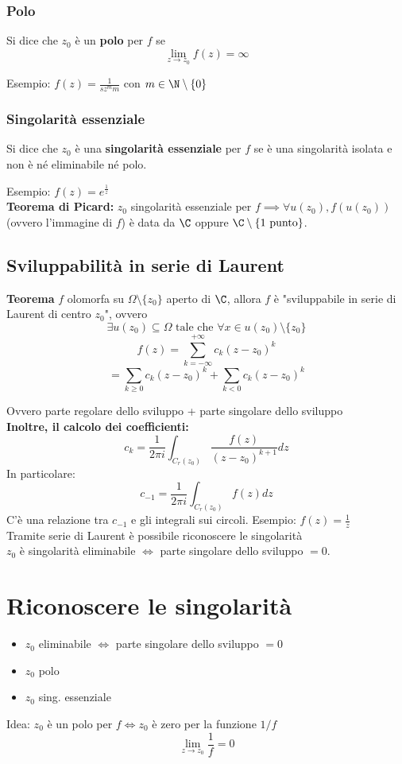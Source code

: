 \subsubsection{Polo}
\begin{tcolorbox}
	Si dice che $z_0$ è un \textbf{polo} per $f$ se 
	\[\lim_{z \to z_0} f(z)=\infty\]
\end{tcolorbox}
Esempio: $f(z)=\frac{1}{sz^mm}$ con $m\in \N\setminus \{0\} $
\subsubsection{Singolarità essenziale}
\begin{tcolorbox}
	Si dice che $z_0$ è una \textbf{singolarità essenziale} per $f$ se è una singolarità isolata e non è né eliminabile né polo.
\end{tcolorbox}
Esempio: $f(z)=e^{\frac{1}{z}}$
\\\textbf{Teorema di Picard: }$z_0$ singolarità essenziale per $f\implies \forall u(z_0),f(u(z_0))$ (ovvero l'immagine di $f$) è data da $\C$ oppure $\C\setminus \{1 \text{ punto}\}$.
\subsection{Sviluppabilità in serie di Laurent}
\begin{tcolorbox}
	\textbf{Teorema} $f$ olomorfa su $\Omega\setminus \{z_0\} $ aperto di $\C$, allora $f$ è "sviluppabile in serie di Laurent di centro $z_0$", ovvero
	\[\exists u(z_0)\subseteq  \Omega \text{ tale che }\forall x\in u(z_0)\setminus \{z_0\} \]
	\[f(z)=\sum_{k=-\infty}^{+\infty} c_k(z-z_0)^k\]
	\[=\sum_{k\ge 0}^{} c_k(z-z_0)^k+\sum_{k<0}^{} c_k(z-z_0)^k\]
\end{tcolorbox}
Ovvero parte regolare dello sviluppo + parte singolare dello sviluppo
\\\textbf{Inoltre, il calcolo dei coefficienti:} 
\[c_k=\frac{1}{2\pi i}\int_{C_r(z_0)}^{} \frac{f(z)}{(z-z_0)^{k+1}}dz\] 
In particolare:
\[c_{-1}=\frac{1}{2\pi i}\int_{C_r(z_0)}^{} f(z)dz\]
C'è una relazione tra $c_{-1}$ e gli integrali sui circoli.
Esempio: $f(z)=\frac{1}{z}$
\\Tramite serie di Laurent è possibile riconoscere le singolarità
\\$z_0$ è singolarità eliminabile $\iff$ parte singolare dello sviluppo $=0$.

\section{Riconoscere le singolarità}
\begin{itemize}
	\item $z_0$ eliminabile $\iff$ parte singolare dello sviluppo $=0$
	\item $z_0$ polo 
	\item $z_0$ sing. essenziale 
\end{itemize}
Idea: $z_0$ è un polo per $f\iff z_0 $ è zero per la funzione $1/f$
\[\lim_{z \to z_0} \frac{1}{f}=0\]
